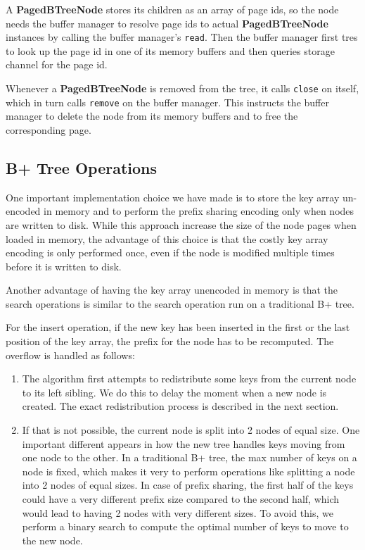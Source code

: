 \documentclass[11pt,a4paper,oneside]{article}
\begin{document}
A \textbf{PagedBTreeNode} stores its children as an array of page ids, 
so the node needs the buffer manager to resolve page ids to actual \textbf{PagedBTreeNode} instances by calling the buffer manager's \texttt{read}.
Then the buffer manager first tres to look up the page id in one of its memory buffers and then queries storage channel for 
the page id.

Whenever a \textbf{PagedBTreeNode} is removed from the tree, it calls \texttt{close} on itself, which in turn calls \texttt{remove} on the buffer manager.
This instructs the buffer manager to delete the node from its memory buffers and to free the corresponding page.

\subsection{B+ Tree Operations} %
\label{sub:b_tree_operations}
One important implementation choice we have made is to store the key array un-encoded in memory and to perform the prefix sharing encoding only when nodes are written to disk. While this approach increase the size of the node pages when loaded in memory, the advantage of this choice is that the costly key array encoding is only performed once, even if the node is modified multiple times before it is written to disk. 

Another advantage of having the key array unencoded in memory is that the search operations is similar to the search operation run on a traditional B+ tree. 

For the insert operation, if the new key has been inserted in the first or the last position of the key array, the prefix for the node has to be recomputed. The overflow is handled as follows:
\begin{enumerate}
	\item The algorithm first attempts to redistribute some keys from the current node to its left sibling. We do this to delay the moment when a new node is created. The exact redistribution process is described in the next section.
	\item If that is not possible, the current node is split into 2 nodes of equal size. One important different appears in how the new tree handles keys moving from one node to the other. In a traditional B+ tree, the max number of keys on a node is fixed, which makes it very to perform operations like splitting a node into 2 nodes of equal sizes. In case of prefix sharing, the first half of the keys could have a very different prefix size compared to the second half, which would lead to having 2 nodes with very different sizes. To avoid this, we perform a binary search to compute the optimal number of keys to move to the new node.
\end{enumerate}
	
\end{document}
